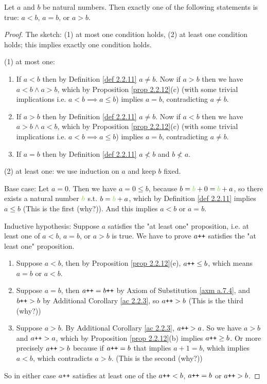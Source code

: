 \begin{proposition} \label{prop 2.2.13}
Let \(a\) and \(b\) be natural numbers. Then exactly one of the following statements is true: \(a < b\), \(a = b\), or \(a > b\).
\end{proposition}
\begin{proof}
The sketch: (1) at most one condition holds, (2) at least one condition holds; this implies exactly one condition holds.

(1) at most one:
    \begin{enumerate}
        \item If \(a < b\) then by Definition \ref{def 2.2.11} \(a \neq b\). Now if \(a > b\) then we have \(a < b \land a > b\), which by Proposition \ref{prop 2.2.12}(c) (with some trivial implications i.e. \(a < b \implies a \leq b\)) implies \(a = b\), contradicting \(a \neq b\).
        \item If \(a > b\) then by Definition \ref{def 2.2.11} \(a \neq b\). Now if \(a < b\) then we have \(a > b \land a < b\), which by Proposition \ref{prop 2.2.12}(c) (with some trivial implications i.e. \(a < b \implies a \leq b\)) implies \(a = b\), contradicting \(a \neq b\).
        \item If \(a = b\) then by Definition \ref{def 2.2.11} \(a \not < b \) and \(b \not < a\).
    \end{enumerate}

(2) at least one: we use induction on \(a\) and keep \(b\) fixed.

Base case: Let \(a = 0\). Then we have \(a = 0 \leq b\), because \(b = \GREEN{b} + 0 = \GREEN{b} + a\), so there exists a natural number \(\GREEN{b}\) s.t. \(b = \GREEN{b} + a\), which by Definition \ref{def 2.2.11} implies \(a \leq b\) (This is the first (why?)). And this implies \(a < b\) or \(a = b\).

Inductive hypothesis: Suppose \(a\) satisfies the "at least one" proposition, i.e. at least one of \(a < b\), \(a = b\), or \(a > b\) is true. We have to prove \(a\texttt{++}\) satisfies the "at least one" proposition.
    \begin{enumerate}
        \item Suppose \(a < b\), then by Proposition \ref{prop 2.2.12}(e), \(a\texttt{++} \leq b\), which means \(a = b\) or \(a < b\).
        \item Suppose \(a = b\), then \(a\texttt{++} = b\texttt{++}\) by Axiom of Substitution \ref{axm a.7.4}, and \(b\texttt{++} > b\) by Additional Corollary \ref{ac 2.2.3}, so \(a\texttt{++} > b\) (This is the third (why?))
        \item Suppose \(a > b\). By Additional Corollary \ref{ac 2.2.3}, \(a\texttt{++} > a\). So we have \(a > b\) and \(a\texttt{++} > a\), which by Proposition \ref{prop 2.2.12}(b) implies \(a\texttt{++} \geq b\). Or more precisely \(a\texttt{++} > b\) because if \(a\texttt{++} = b\) that implies \(a + 1 = b\), which implies \(a < b\), which contradicts \(a > b\). (This is the second (why?))
    \end{enumerate}
So in either case \(a\texttt{++}\) satisfies at least one of the \(a\texttt{++} < b\), \(a\texttt{++} = b\) or \(a\texttt{++} > b\).
\end{proof}


